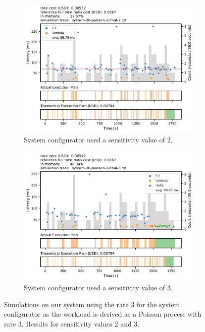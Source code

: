 \begin{figure}[pht!]
    \centering
    \begin{subfigure}{.8\textwidth}
        \includegraphics[width=\linewidth]{figures/system-30-poisson-3-final-2.pdf}
        \caption{System configurator used a sensitivity value of 2.}
        \label{fig:poisson_3_2}
    \end{subfigure}
    \begin{subfigure}{.8\textwidth}
        \includegraphics[width=\linewidth]{figures/system-30-poisson-3-final-3.pdf}
        \caption{System configurator used a sensitivity value of 3.}
        \label{fig:poisson_3_3}
    \end{subfigure}
    \caption{Simulations on our system using the rate 3 for the system configurator as the workload is derived as a Poisson process with rate 3. Results for sensitivity values 2 and 3.}
    \label{fig:poisson_3_23}
\end{figure}

